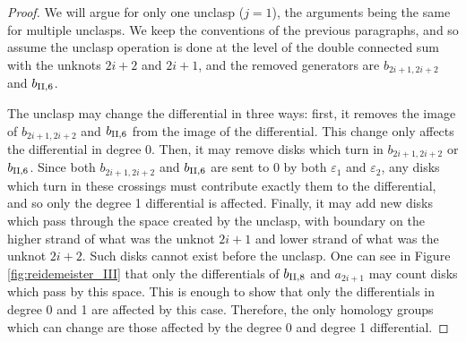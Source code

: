 \documentclass[11pt]{amsart}
\theoremstyle{plain}
\theoremstyle{remark}
\numberwithin{equation}{section}
\begin{document}
\begin{proof}
We will argue for only one unclasp ($j=1$), the arguments being the same for multiple unclasps. We keep the conventions of the previous paragraphs, and so assume the unclasp operation is done at the level of the double connected sum with the unknots $2i+2$ and $2i+1$, and the removed generators are $b_{2i+1,2i+2}$ and $b_{\rm II,6}$.

The unclasp may change the differential in three ways: first, it removes the image of $b_{2i+1,2i+2}$ and $b_{\rm II,6}$ from the image of the differential. This change only affects the differential in degree 0. Then, it may remove disks which turn in $b_{2i+1,2i+2}$ or $b_{\rm II,6}$. Since both $b_{2i+1,2i+2}$ and $b_{\rm II,6}$ are sent to 0 by both $\varepsilon_1$ and $\varepsilon_2$, any disks which turn in these crossings must contribute exactly them to the differential, and so only the degree 1 differential is affected.
Finally, it may add new disks which pass through the space created by the unclasp, with boundary on the higher strand of what was the unknot $2i+1$ and lower strand of what was the unknot $2i+2$. Such disks cannot exist before the unclasp. One can see in Figure \ref{fig:reidemeister_III} that only the differentials of $b_{\rm II,8}$ and $a_{2i+1}$ may count disks which pass by this space. This is enough to show that only the differentials in degree 0 and 1 are affected by this case. Therefore, the only homology groups which can change are those affected by the degree 0 and degree 1 differential. 


\end{proof}
\end{document}
